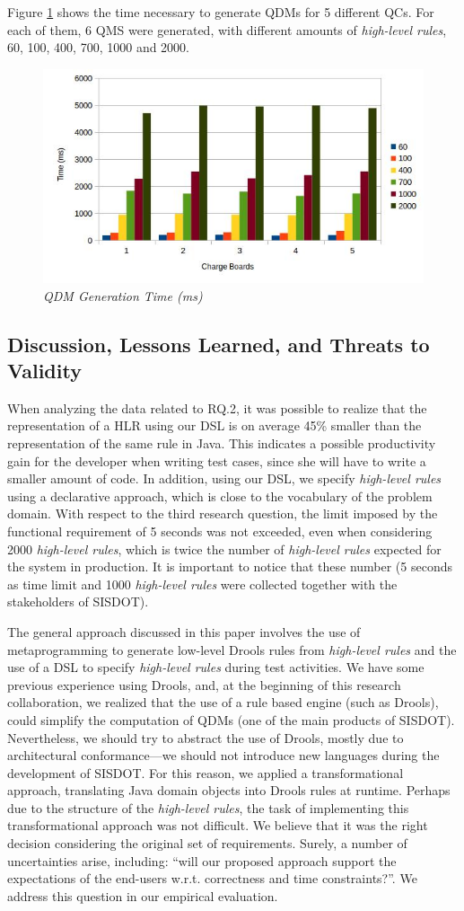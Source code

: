 \documentclass{bmcart}
\newcommand{\callers}{\emph{high-level rules}\xspace}
\newcommand{\shc}{HLR\xspace}
\begin{document}
Figure \ref{fig:geracao} shows the time necessary to generate QDMs for 5 different QCs. For each of them, 6 QMS were generated, with different amounts of \callers, 60, 100, 400, 700, 1000 and 2000.

\begin{figure}[!ht] \centering
	\includegraphics[width=.48\textwidth]
	{img/artigo_geracao.jpg}
	\caption{\it QDM Generation Time (ms)}
	\label{fig:geracao}
\end{figure}



\subsection*{Discussion, Lessons Learned, and Threats to Validity}
When analyzing the data related to RQ.2, it was possible to realize that the representation of a \shc using our DSL is on average 45\% smaller than the representation of the same rule in Java. This indicates a possible productivity gain for the developer when writing test cases, since she will have to write a smaller amount of code. In addition, using our DSL, we specify \callers using a declarative approach, which is close to the vocabulary of the problem domain. With respect to the third research question, the limit imposed by the functional requirement of 5 seconds was not exceeded, even when considering 2000 \callers, which is twice the number of \callers expected for the system in production. It is important to notice that these number (5 seconds as time limit and 1000 \callers were collected together with the stakeholders of SISDOT).

The general approach discussed in this paper involves the use of metaprogramming to generate low-level Drools rules from \callers and the use of a DSL to specify \callers during test activities. We have some previous experience using Drools, and, at the beginning of this research collaboration, we realized that the use of a rule based engine (such as Drools), could simplify the computation of QDMs
(one of the main products of SISDOT). Nevertheless, we should try to abstract the use of Drools, mostly due to architectural conformance---we should not introduce new languages during the development of SISDOT. For this reason, we applied a transformational approach, translating Java domain objects into Drools rules at runtime. Perhaps due to the structure of the \callers, the task of implementing this transformational approach was not difficult. We believe that it was the right decision considering the original set of requirements. Surely, a number of uncertainties arise, including: ``will our proposed approach support the expectations of the end-users w.r.t. correctness and time constraints?''. We address this question in our empirical evaluation.
\end{document}

